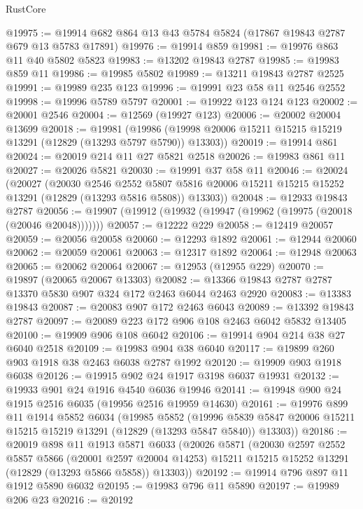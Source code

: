 \begin{lexlean}{RustCore}
\begin{coremodule}
@19975 := @19914 @682 @864 @13 @43 @5784 @5824 (@17867 @19843 @2787 @679 @13 @5783 @17891)
@19976 := @19914 @859
@19981 := @19976 @863 @11 @40 @5802 @5823
@19983 := @13202 @19843 @2787
@19985 := @19983 @859 @11
@19986 := @19985 @5802
@19989 := @13211 @19843 @2787 @2525
@19991 := @19989 @235 @123
@19996 := @19991 @23 @58 @11 @2546 @2552
@19998 := @19996 @5789 @5797
@20001 := @19922 @123 @124 @123
@20002 := @20001 @2546
@20004 := @12569 (@19927 @123)
@20006 := @20002 @20004 @13699
@20018 := @19981
    (@19986 (@19998 @20006 @15211 @15215 @15219 @13291 (@12829 (@13293 @5797 @5790)) @13303))
@20019 := @19914 @861
@20024 := @20019 @214 @11 @27 @5821 @2518
@20026 := @19983 @861 @11
@20027 := @20026 @5821
@20030 := @19991 @37 @58 @11
@20046 := @20024
    (@20027
      (@20030
        @2546
        @2552
        @5807
        @5816
        @20006
        @15211
        @15215
        @15252
        @13291
        (@12829 (@13293 @5816 @5808))
        @13303))
@20048 := @12933 @19843 @2787
@20056 := @19907 (@19912 (@19932 (@19947 (@19962 (@19975 (@20018 (@20046 @20048)))))))
@20057 := @12222 @229
@20058 := @12419 @20057
@20059 := @20056 @20058
@20060 := @12293 @1892
@20061 := @12944 @20060
@20062 := @20059 @20061
@20063 := @12317 @1892
@20064 := @12948 @20063
@20065 := @20062 @20064
@20067 := @12953 (@12955 @229)
@20070 := @19897 (@20065 @20067 @13303)
@20082 := @13366 @19843 @2787 @2787 @13370 @5830 @907 @324 @172 @2463 @6044 @2463 @2920
@20083 := @13383 @19843
@20087 := @20083 @907 @172 @2463 @6043
@20089 := @13392 @19843 @2787
@20097 := @20089 @223 @172 @906 @108 @2463 @6042 @5832 @13405
@20100 := @19909 @906 @108 @6042
@20106 := @19914 @904 @214 @38 @27 @6040 @2518
@20109 := @19983 @904 @38 @6040
@20117 := @19899 @260 @903 @1918 @38 @2463 @6038 @2787 @1992
@20120 := @19909 @903 @1918 @6038
@20126 := @19915 @902 @24 @1917 @3198 @6037 @19931
@20132 := @19933 @901 @24 @1916 @4540 @6036 @19946
@20141 := @19948 @900 @24 @1915 @2516 @6035 (@19956 @2516 @19959 @14630)
@20161 := @19976
    @899
    @11
    @1914
    @5852
    @6034
    (@19985
      @5852
      (@19996 @5839 @5847 @20006 @15211 @15215 @15219 @13291 (@12829 (@13293 @5847 @5840)) @13303))
@20186 := @20019
    @898
    @11
    @1913
    @5871
    @6033
    (@20026
      @5871
      (@20030
        @2597
        @2552
        @5857
        @5866
        (@20001 @2597 @20004 @14253)
        @15211
        @15215
        @15252
        @13291
        (@12829 (@13293 @5866 @5858))
        @13303))
@20192 := @19914 @796 @897 @11 @1912 @5890 @6032
@20195 := @19983 @796 @11 @5890
@20197 := @19989 @206 @23
@20216 := @20192

\end{coremodule}
\end{lexlean}
